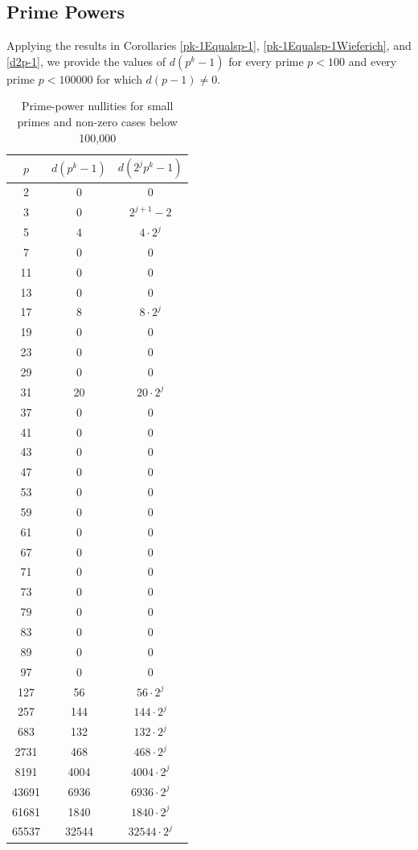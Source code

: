 \documentclass[a4paper]{article}
\begin{document}
	\subsection{Prime Powers}
	Applying the results in Corollaries \ref{pk-1Equalsp-1}, \ref{pk-1Equalsp-1Wieferich}, and \ref{d2p-1}, we provide the values of $d(p^k-1)$ for every prime $p<100$ and every prime $p<100000$ for which $d(p-1)\neq0$.
	\begin{table}[h]
		\centering
		\begin{tabular}{|c|c|c|}
			\hline
			$p$ & $d(p^k - 1)$ & $d(2^jp^k - 1)$ \\ \hline\hline
			2 & 0 & 0 \\ \hline
			3 & 0 & $2^{j+1}-2$ \\ \hline
			5 & 4 & $4 \cdot 2^{j}$\\ \hline
			7 & 0 & 0 \\ \hline
			11 & 0 & 0 \\ \hline
			13 & 0 & 0 \\ \hline
			17 & 8 & $8 \cdot 2^{j}$ \\ \hline
			19 & 0 & 0 \\ \hline
			23 & 0 & 0 \\ \hline
			29 & 0 & 0 \\ \hline
			31 & 20 & $20 \cdot 2^{j}$ \\ \hline
			37 & 0 & 0 \\ \hline
			41 & 0 & 0 \\ \hline
			43 & 0 & 0 \\ \hline
			47 & 0 & 0 \\ \hline
			53 & 0 & 0 \\ \hline
			59 & 0 & 0 \\ \hline
			61 & 0 & 0 \\ \hline
			67 & 0 & 0 \\ \hline
			71 & 0 & 0 \\ \hline
			73 & 0 & 0 \\ \hline
			79 & 0 & 0 \\ \hline
			83 & 0 & 0 \\ \hline
			89 & 0 & 0 \\ \hline
			97 & 0 & 0 \\ \hline
			127 & 56 & $56 \cdot 2^{j}$\\ \hline
			257 & 144 & $144 \cdot 2^{j}$ \\ \hline
			683 & 132 & $132 \cdot 2^{j}$ \\ \hline
			2731 & 468 & $468 \cdot 2^{j}$ \\ \hline
			8191 & 4004 & $4004 \cdot 2^{j}$ \\ \hline
			43691 & 6936 & $6936 \cdot 2^{j}$ \\ \hline
			61681 & 1840 & $1840 \cdot 2^{j}$ \\ \hline
			65537 & 32544 & $32544 \cdot 2^{j}$ \\ \hline
		\end{tabular}
		\caption{Prime-power nullities for small primes and non-zero cases below 100,000}
	\end{table}
	
	\newpage
	
	
\end{document}
